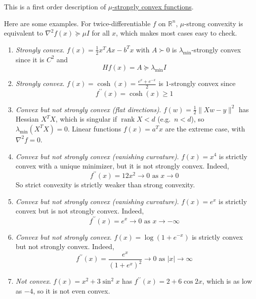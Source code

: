 	This is a first order description of \hyperref[def:mu-strongly-convex]{$\mu$-strongly convex functions}. 

	\begin{example}
	  Here are some examples. For twice-differentiable $f$ on $\mathbb{R}^n$, $\mu$-strong convexity is equivalent to $\nabla^2 f(x) \succeq \mu I$ for all $x$, which makes most cases easy to check. 
		\begin{enumerate}
			\item \textit{Strongly convex}. $f(x) = \frac{1}{2} x^T A x - b^T x$ with $A \succ 0$ is $\lambda_{\min}$-strongly convex since it is $C^2$ and 
				\begin{equation}
					Hf(x) = A \succeq \lambda_{\min} I
				\end{equation}

		  \item \textit{Strongly convex}. $f(x) = \cosh(x) = \frac{e^x + e^{-x}}{2}$ is $1$-strongly convex since 
				\begin{equation}
				  f^{\prime\prime}(x) = \cosh(x) \geq 1
				\end{equation}

		  \item \textit{Convex but not strongly convex (flat directions)}. $f(w) = \frac{1}{2}\|Xw - y\|^2$ has Hessian $X^T X$, which is singular if $\operatorname{rank} X < d$ (e.g.\ $n < d$), so $\lambda_{\min}(X^T X) = 0$. Linear functions $f(x) = a^T x$ are the extreme case, with $\nabla^2 f = 0$. 

		  \item \textit{Convex but not strongly convex (vanishing curvature)}. $f(x) = x^4$ is strictly convex with a unique minimizer, but it is not strongly convex. Indeed, 
				\begin{equation}
					f^{\prime\prime}(x) = 12x^2 \to 0 \text{ as } x \to 0
				\end{equation}
				So strict convexity is strictly weaker than strong convexity. 


			\item \textit{Convex but not strongly convex (vanishing curvature)}. $f(x) = e^x$ is strictly convex but is not strongly convex. Indeed, 
				\begin{equation}
					f^{\prime\prime}(x) = e^x \to 0 \text{ as } x \to -\infty
				\end{equation}

			\item \textit{Convex but not strongly convex}. $f(x) = \log(1 + e^{-x})$ is strictly convex but not strongly convex. Indeed, 
				\begin{equation}
					f^{\prime\prime}(x) = \frac{e^{x}}{(1 + e^{x})^2} \to 0 \text{ as } |x| \to \infty
				\end{equation}

		  \item \textit{Not convex}. $f(x) = x^2 + 3\sin^2 x$ has $f^{\prime\prime}(x) = 2 + 6\cos 2x$, which is as low as $-4$, so it is not even convex. 
		\end{enumerate}
	\end{example}

